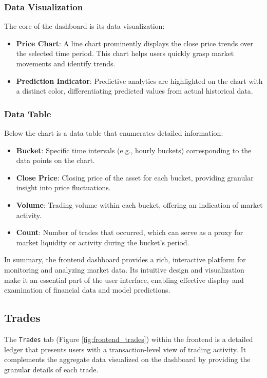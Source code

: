 \subsubsection{Data Visualization}
The core of the dashboard is its data visualization:
\begin{itemize}
    \item \textbf{Price Chart}: A line chart prominently displays the close price trends over the selected time period. This chart helps users quickly grasp market movements and identify trends.
    \item \textbf{Prediction Indicator}: Predictive analytics are highlighted on the chart with a distinct color, differentiating predicted values from actual historical data.
\end{itemize}

\subsubsection{Data Table}
Below the chart is a data table that enumerates detailed information:
\begin{itemize}
    \item \textbf{Bucket}: Specific time intervals (e.g., hourly buckets) corresponding to the data points on the chart.
    \item \textbf{Close Price}: Closing price of the asset for each bucket, providing granular insight into price fluctuations.
    \item \textbf{Volume}: Trading volume within each bucket, offering an indication of market activity.
    \item \textbf{Count}: Number of trades that occurred, which can serve as a proxy for market liquidity or activity during the bucket's period.
\end{itemize}


In summary, the frontend dashboard provides a rich, interactive platform for monitoring and analyzing market data. Its intuitive design and visualization make it an essential part of the user interface, enabling effective display and examination of financial data and model predictions.

\subsection{Trades}

The \texttt{Trades} tab (Figure \ref{fig:frontend_trades}) within the frontend is a detailed ledger that presents users with a transaction-level view of trading activity. It complements the aggregate data visualized on the dashboard by providing the granular details of each trade.

